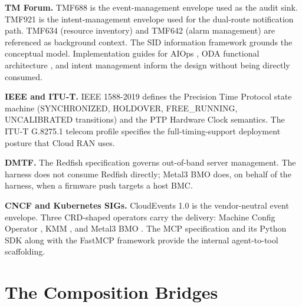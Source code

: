 \documentclass[twocolumn,10pt,a4paper]{article}
\begin{document}
\textbf{TM Forum.} TMF688 \cite{tmf688} is the event-management envelope used as the audit sink. TMF921 \cite{tmf921} is the intent-management envelope used for the dual-route notification path. TMF634 \cite{tmf634} (resource inventory) and TMF642 \cite{tmf642} (alarm management) are referenced as background context. The SID information framework \cite{tmf_gb922} grounds the conceptual model. Implementation guides for AIOps \cite{tmf_ig1228}, ODA functional architecture \cite{tmf_ig1190}, and intent management \cite{tmf_ig1253} inform the design without being directly consumed.

\textbf{IEEE and ITU-T.} IEEE 1588-2019 \cite{ieee_1588_2019} defines the Precision Time Protocol state machine (SYNCHRONIZED, HOLDOVER, FREE\_RUNNING, UNCALIBRATED transitions) and the PTP Hardware Clock semantics. The ITU-T G.8275.1 telecom profile \cite{itu_g82751} specifies the full-timing-support deployment posture that Cloud RAN uses.

\textbf{DMTF.} The Redfish specification \cite{dmtf_redfish} governs out-of-band server management. The harness does not consume Redfish directly; Metal3 BMO does, on behalf of the harness, when a firmware push targets a host BMC.

\textbf{CNCF and Kubernetes SIGs.} CloudEvents 1.0 \cite{cncf_cloudevents} is the vendor-neutral event envelope. Three CRD-shaped operators carry the delivery: Machine Config Operator \cite{openshift_mco}, KMM \cite{kmm_operator}, and Metal3 BMO \cite{metal3_bmo}. The MCP specification \cite{mcp_spec} and its Python SDK \cite{mcp_python_sdk} along with the FastMCP framework \cite{fastmcp} provide the internal agent-to-tool scaffolding.

\section{The Composition Bridges}
\label{sec:bridges}
\end{document}
